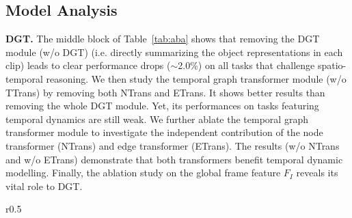 \documentclass[runningheads]{llncs}
\begin{document}
\subsection{Model Analysis}
\label{sec:analysis}

\textbf{DGT.} 
The middle block of Table~\ref{tab:aba} shows that removing the DGT module (w/o DGT) (i.e. directly summarizing the object representations in each clip) leads to clear performance drops ($\sim$2.0\%) on all tasks that 
challenge spatio-temporal reasoning. We then study the temporal graph transformer module (w/o TTrans) by removing both NTrans and ETrans. It shows better results than removing the whole DGT module. Yet, its performances on tasks featuring temporal dynamics are still weak. We further ablate the temporal graph transformer module to investigate the independent contribution of the node transformer (NTrans) and edge transformer (ETrans). The results (w/o NTrans and w/o ETrans) demonstrate that both transformers
benefit temporal dynamic modelling. Finally, the ablation study on the global frame feature $F_I$ reveals its vital role to DGT.

\setlength{\tabcolsep}{1pt}
\begin{wraptable}[8]{r}{0.5\textwidth}
\vspace{-10pt}
    \small
    \centering
    \caption{Study of model components}
    \label{tab:aba}
    \vspace{4pt}
    \vspace{-0.3cm}
\end{wraptable}
\end{document}

